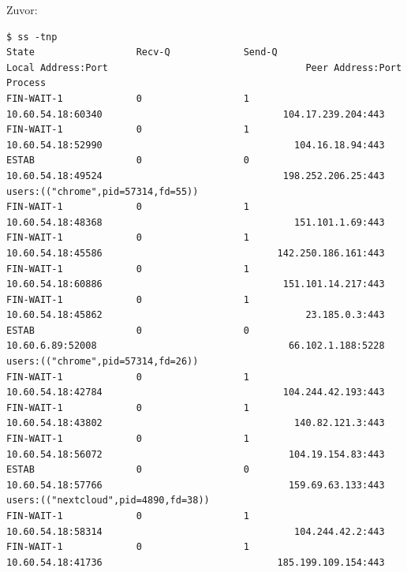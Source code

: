Zuvor:

\begin{verbatim}
$ ss -tnp
State                  Recv-Q             Send-Q                                                    Local Address:Port                                   Peer Address:Port             Process
FIN-WAIT-1             0                  1                                                           10.60.54.18:60340                                104.17.239.204:443
FIN-WAIT-1             0                  1                                                           10.60.54.18:52990                                  104.16.18.94:443
ESTAB                  0                  0                                                           10.60.54.18:49524                                198.252.206.25:443               users:(("chrome",pid=57314,fd=55))
FIN-WAIT-1             0                  1                                                           10.60.54.18:48368                                  151.101.1.69:443
FIN-WAIT-1             0                  1                                                           10.60.54.18:45586                               142.250.186.161:443
FIN-WAIT-1             0                  1                                                           10.60.54.18:60886                                151.101.14.217:443
FIN-WAIT-1             0                  1                                                           10.60.54.18:45862                                    23.185.0.3:443
ESTAB                  0                  0                                                            10.60.6.89:52008                                  66.102.1.188:5228              users:(("chrome",pid=57314,fd=26))
FIN-WAIT-1             0                  1                                                           10.60.54.18:42784                                104.244.42.193:443
FIN-WAIT-1             0                  1                                                           10.60.54.18:43802                                  140.82.121.3:443
FIN-WAIT-1             0                  1                                                           10.60.54.18:56072                                 104.19.154.83:443
ESTAB                  0                  0                                                           10.60.54.18:57766                                 159.69.63.133:443               users:(("nextcloud",pid=4890,fd=38))
FIN-WAIT-1             0                  1                                                           10.60.54.18:58314                                  104.244.42.2:443
FIN-WAIT-1             0                  1                                                           10.60.54.18:41736                               185.199.109.154:443
\end{verbatim}

